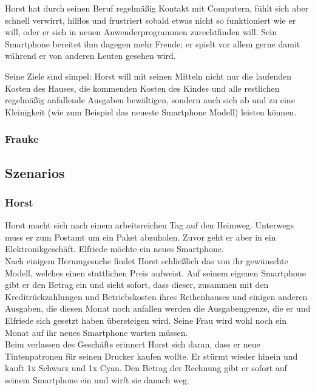 Horst hat durch seinen Beruf regelm\"a\ss ig Kontakt mit Computern, f\"uhlt sich aber schnell verwirrt, hilflos und
frustriert sobald etwas nicht so funktioniert wie er will, oder er sich in neuen Anwenderprogrammen zurechtfinden will.
Sein Smartphone bereitet ihm dagegen mehr Freude; er spielt vor allem gerne damit w\"ahrend
er von anderen Leuten gesehen wird.

Seine Ziele sind simpel: Horst will mit seinen Mitteln nicht nur die laufenden Kosten des Hauses,
die kommenden Kosten des Kindes und alle restlichen regelm\"a\ss ig anfallende Ausgaben bew\"altigen,
sondern auch sich ab und zu eine Kleinigkeit (wie zum Beispiel das neueste Smartphone Modell) leisten k\"onnen.

\subsubsection{Frauke}

\subsection{Szenarios}

\subsubsection{Horst}

Horst macht sich nach einem arbeitsreichen Tag auf den Heimweg. Unterwegs muss er zum
Postamt um ein Paket abzuholen. Zuvor geht er aber in ein Elektronikgesch\"aft.
Elfriede m\"ochte ein neues Smartphone.\\

Nach einigem Herumgesuche findet Horst schlie\ss lich das von ihr gew\"unschte
Modell, welches einen stattlichen Preis aufweist. Auf seinem eigenen
Smartphone gibt er den Betrag ein und sieht sofort, dass dieser, zusammen
mit den Kreditr\"uckzahlungen und Betriebskosten ihres Reihenhauses und
einigen anderen Ausgaben, die diesen Monat noch anfallen werden die
Ausgabengrenze, die er und Elfriede sich gesetzt haben \"ubersteigen wird.
Seine Frau wird wohl noch ein Monat auf ihr neues Smartphone warten
m\"ussen.\\

Beim verlassen des Gesch\"afts erinnert Horst sich daran, dass er neue
Tintenpatronen für seinen Drucker kaufen wollte. Er st\"urmt wieder hinein
und kauft 1x Schwarz und 1x Cyan. Den Betrag der Rechnung gibt er sofort
auf seinem Smartphone ein und wirft sie danach weg.\\

